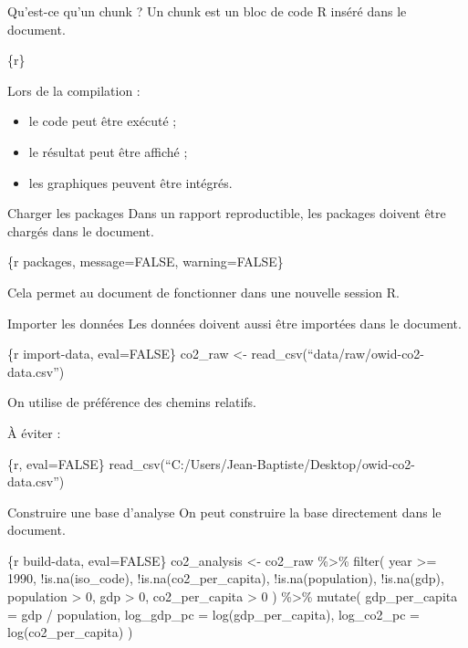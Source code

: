 \documentclass[
  10pt,
  ignorenonframetext,
]{beamer}
\providecommand{\tightlist}{%
  \setlength{\itemsep}{0pt}\setlength{\parskip}{0pt}}
\begin{document}
\begin{frame}{Qu'est-ce qu'un chunk ?}
\label{quest-ce-quun-chunk}
Un chunk est un bloc de code R inséré dans le document.

\{r\}

Lors de la compilation :

\begin{itemize}
\tightlist
\item
  le code peut être exécuté ;
\item
  le résultat peut être affiché ;
\item
  les graphiques peuvent être intégrés.
\end{itemize}
\end{frame}

\begin{frame}{Charger les packages}
\label{charger-les-packages}
Dans un rapport reproductible, les packages doivent être chargés dans le
document.

\{r packages, message=FALSE, warning=FALSE\}

Cela permet au document de fonctionner dans une nouvelle session R.
\end{frame}

\begin{frame}{Importer les données}
\label{importer-les-donnuxe9es}
Les données doivent aussi être importées dans le document.

\{r import-data, eval=FALSE\} co2\_raw \textless-
read\_csv(``data/raw/owid-co2-data.csv'')

On utilise de préférence des chemins relatifs.

À éviter :

\{r, eval=FALSE\}
read\_csv(``C:/Users/Jean-Baptiste/Desktop/owid-co2-data.csv'')
\end{frame}

\begin{frame}{Construire une base d'analyse}
\label{construire-une-base-danalyse}
On peut construire la base directement dans le document.

\{r build-data, eval=FALSE\} co2\_analysis \textless- co2\_raw
\%\textgreater\% filter( year \textgreater= 1990, !is.na(iso\_code),
!is.na(co2\_per\_capita), !is.na(population), !is.na(gdp), population
\textgreater{} 0, gdp \textgreater{} 0, co2\_per\_capita \textgreater{}
0 ) \%\textgreater\% mutate( gdp\_per\_capita = gdp / population,
log\_gdp\_pc = log(gdp\_per\_capita), log\_co2\_pc =
log(co2\_per\_capita) )
\end{frame}
\end{document}
